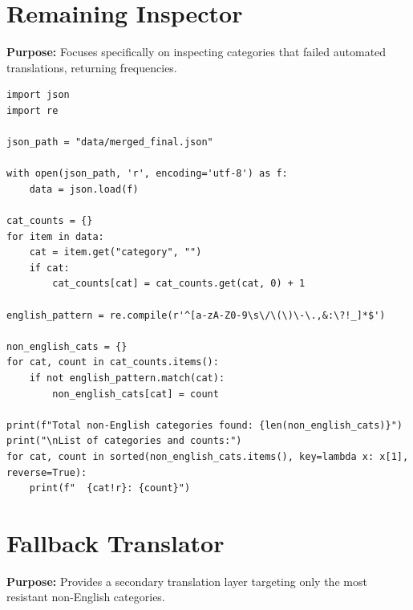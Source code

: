 \documentclass[11pt]{article}
\begin{document}
\section{Remaining Inspector} \label{sec:remaininspector}
\textbf{Purpose:} Focuses specifically on inspecting categories that failed automated translations, returning frequencies.

\begin{lstlisting}[style=pythoncode, caption={inspect\_remaining.py}]
import json
import re

json_path = "data/merged_final.json"

with open(json_path, 'r', encoding='utf-8') as f:
    data = json.load(f)

cat_counts = {}
for item in data:
    cat = item.get("category", "")
    if cat:
        cat_counts[cat] = cat_counts.get(cat, 0) + 1

english_pattern = re.compile(r'^[a-zA-Z0-9\s\/\(\)\-\.,&:\?!_]*$')

non_english_cats = {}
for cat, count in cat_counts.items():
    if not english_pattern.match(cat):
        non_english_cats[cat] = count

print(f"Total non-English categories found: {len(non_english_cats)}")
print("\nList of categories and counts:")
for cat, count in sorted(non_english_cats.items(), key=lambda x: x[1], reverse=True):
    print(f"  {cat!r}: {count}")
\end{lstlisting}


\section{Fallback Translator} \label{sec:fallbacktranslator}
\textbf{Purpose:} Provides a secondary translation layer targeting only the most resistant non-English categories.
\end{document}
